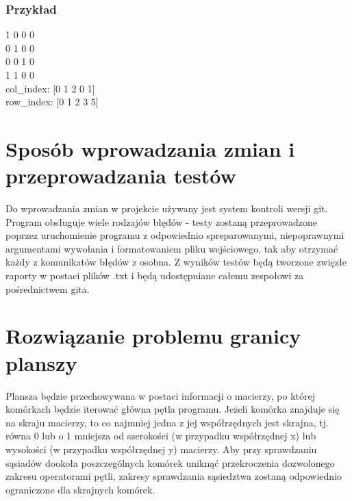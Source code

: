 \documentclass[11pt,a4paper]{report}
\begin{document}
\subsubsection{Przykład}
1 0 0 0\\
0 1 0 0\\
0 0 1 0\\
1 1 0 0\\
col\_index: [0 1 2 0 1]\\
row\_index: [0 1 2 3 5]

\section{Sposób wprowadzania zmian i przeprowadzania testów}\label{sec:teskt}
Do wprowadzania zmian w projekcie używany jest system kontroli wersji git.
Program obsługuje wiele rodzajów błędów - testy zostaną przeprowadzone poprzez uruchomienie programu z odpowiednio spreparowanymi, niepoprawnymi argumentami wywołania i formatowaniem pliku wejściowego, tak aby otrzymać każdy z komunikatów błędów z osobna.
Z wyników testów będą tworzone zwięzłe raporty w postaci plików .txt i będą udostępniane całemu zespołowi za pośrednictwem gita.

\section {Rozwiązanie problemu granicy planszy}\label{sec:teskt}
Plansza będzie przechowywana w postaci informacji o macierzy, po której komórkach będzie iterować główna pętla programu.
Jeżeli komórka znajduje się na skraju macierzy, to co najmniej jedna z jej współrzędnych jest skrajna, tj. równa 0 lub o 1 mniejsza od szerokości (w przypadku współrzędnej x) lub wysokości (w przypadku współrzędnej y) macierzy.
Aby przy sprawdzaniu sąsiadów dookoła poszczególnych komórek uniknąć przekroczenia dozwolonego zakresu operatorami pętli, zakresy sprawdzania sąsiedztwa zostaną odpowiednio ograniczone dla skrajnych komórek.
\end{document}
